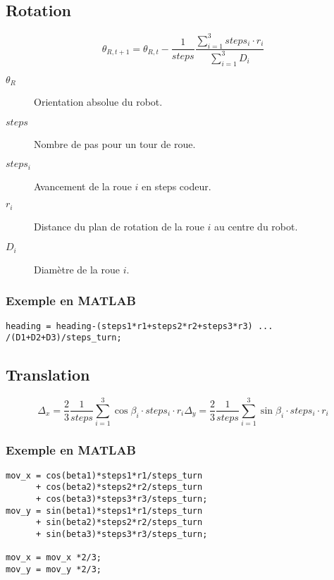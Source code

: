 \documentclass[a4paper]{paper}
\begin{document}
\subsection{Rotation}
\begin{equation}
    \theta_{R, t+1} = \theta_{R, t} - \frac{1}{steps} \frac{\sum\limits_{i=1}^3 steps_i \cdot r_i}{\sum\limits_{i=1}^3 D_i}
    \label{eqn:reverse-heading}
\end{equation}
\begin{description}
    \item[$\theta_R$] Orientation absolue du robot.
    \item[$steps$] Nombre de pas pour un tour de roue.
    \item[$steps_i$] Avancement de la roue $i$ en steps codeur.
    \item[$r_i$] Distance du plan de rotation de la roue $i$ au centre du robot.
    \item[$D_i$] Diamètre de la roue $i$.
\end{description}

\subsubsection{Exemple en MATLAB}
\begin{lstlisting}
heading = heading-(steps1*r1+steps2*r2+steps3*r3) ...
/(D1+D2+D3)/steps_turn;
\end{lstlisting}

\subsection{Translation}
\begin{subequations}
    \begin{equation}
    \Delta_x = \frac{2}{3} \frac{1}{steps} \sum\limits_{i=1}^3 \cos \beta_i \cdot steps_i \cdot r_i 
    \end{equation}
    \begin{equation}
    \Delta_y = \frac{2}{3} \frac{1}{steps} \sum\limits_{i=1}^3 \sin \beta_i \cdot steps_i \cdot r_i 
    \end{equation}

    \label{eqn:reverse-translation}
\end{subequations}

\subsubsection{Exemple en MATLAB}
\begin{lstlisting}
mov_x = cos(beta1)*steps1*r1/steps_turn
      + cos(beta2)*steps2*r2/steps_turn
      + cos(beta3)*steps3*r3/steps_turn;
mov_y = sin(beta1)*steps1*r1/steps_turn
      + sin(beta2)*steps2*r2/steps_turn
      + sin(beta3)*steps3*r3/steps_turn;

mov_x = mov_x *2/3;
mov_y = mov_y *2/3;
\end{lstlisting}
\end{document}
